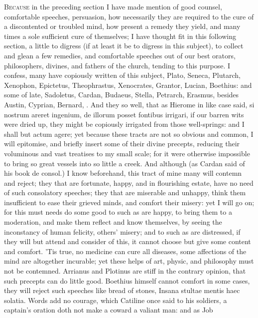 {\lettrine{B}{ecause} in the preceding section I have made mention of good counsel,
comfortable speeches, persuasion, how necessarily they are required to
the cure of a discontented or troubled mind, how present a remedy they
yield, and many times a sole sufficient cure of themselves; I have
thought fit in this following section, a little to digress (if at least
it be to digress in this subject), to collect and glean a few remedies,
and comfortable speeches out of our best orators, philosophers,
divines, and fathers of the church, tending to this purpose. I confess,
many have copiously written of this subject, Plato, Seneca, Plutarch,
Xenophon, Epictetus, Theophrastus, Xenocrates, Grantor, Lucian,
Boethius: and some of late, Sadoletus, Cardan, Budaeus, Stella,
Petrarch, Erasmus, besides Austin, Cyprian, Bernard, \etc{}. And they so
well, that as Hierome in like case said, si nostrum areret ingenium, de
illorum posset fontibus irrigari, if our barren wits were dried up,
they might be copiously irrigated from those well-springs: and I shall
but actum agere; yet because these tracts are not so obvious and
common, I will epitomise, and briefly insert some of their divine
precepts, reducing their voluminous and vast treatises to my small
scale; for it were otherwise impossible to bring so great vessels into
so little a creek. And although (as Cardan said of his book de consol.)
I know beforehand, this tract of mine many will contemn and
reject; they that are fortunate, happy, and in flourishing estate, have
no need of such consolatory speeches; they that are miserable and
unhappy, think them insufficient to ease their grieved minds, and
comfort their misery: yet I will go on; for this must needs do some
good to such as are happy, to bring them to a moderation, and make them
reflect and know themselves, by seeing the inconstancy of human
felicity, others' misery; and to such as are distressed, if they will
but attend and consider of this, it cannot choose but give some content
and comfort. 'Tis true, no medicine can cure all diseases, some
affections of the mind are altogether incurable; yet these helps of
art, physic, and philosophy must not be contemned. Arrianus and
Plotinus are stiff in the contrary opinion, that such precepts can do
little good. Boethius himself cannot comfort in some cases, they will
reject such speeches like bread of stones, Insana stultae mentis haec
solatia. 
Words add no courage, which Catiline once said to his soldiers, a
captain's oration doth not make a coward a valiant man: and as Job
}
